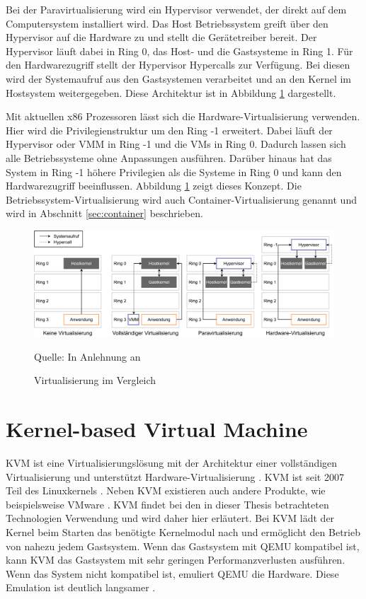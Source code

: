 Bei der Paravirtualisierung wird ein Hypervisor verwendet, der direkt auf dem Computersystem installiert wird. Das Host Betriebssystem greift über den Hypervisor auf die Hardware zu und stellt die Gerätetreiber bereit. Der Hypervisor läuft dabei in Ring 0, das Host- und die Gastsysteme in Ring 1. Für den Hardwarezugriff stellt der Hypervisor Hypercalls zur Verfügung. Bei diesen wird der Systemaufruf aus den Gastsystemen verarbeitet und an den Kernel im Hostsystem weitergegeben. Diese Architektur ist in Abbildung \ref{fig:virtualiserung} dargestellt.  \cite[vgl.][S. 237 f.]{Baun.2017}

Mit aktuellen x86 Prozessoren lässt sich die Hardware-Virtualisierung verwenden. Hier wird die Privilegienstruktur um den Ring -1 erweitert. Dabei läuft der Hypervisor oder \ac{VMM} in Ring -1 und die \acp{VM} in Ring 0. Dadurch lassen sich alle Betriebssysteme ohne Anpassungen ausführen. Darüber hinaus hat das System in Ring -1 höhere Privilegien als die Systeme in Ring 0 und kann den Hardwarezugriff beeinflussen. Abbildung \ref{fig:virtualiserung} zeigt dieses Konzept. Die Betriebssystem-Virtualisierung wird auch Container-Virtualisierung genannt und wird in Abschnitt \ref{sec:container} beschrieben. \cite[vgl.][S. 237 f.]{Baun.2017}

\begin{figure}[hb]
	\centering
	\includegraphics[width=1\linewidth]{gfx/virtualiserung.pdf}
	\caption{Virtualisierung im Vergleich}
	\footnotesize Quelle: In Anlehnung an \cite[vgl.][236, 238, 240]{Baun.2017}
	\label{fig:virtualiserung}
\end{figure} 

\section{Kernel-based Virtual Machine}
\label{sec:kvm}
\ac{KVM} ist eine Virtualisierungslösung mit der Architektur einer vollständigen Virtualisierung und unterstützt Hardware-Virtualisierung . \ac{KVM} ist seit 2007 Teil des Linuxkernels \cite[vgl.][8]{Peichert.20150928}. Neben \ac{KVM} existieren auch andere Produkte, wie beispielsweise VMware \cite[vgl.][237]{Baun.2017}. \ac{KVM} findet bei den in dieser Thesis betrachteten Technologien Verwendung und wird daher hier erläutert.
Bei \ac{KVM} lädt der Kernel beim Starten das benötigte Kernelmodul nach und ermöglicht den Betrieb von nahezu jedem Gastsystem. Wenn das Gastsystem mit \ac{QEMU} kompatibel ist, kann \ac{KVM} das Gastsystem mit sehr geringen Performanzverlusten ausführen. Wenn das System nicht kompatibel ist, emuliert \ac{QEMU} die Hardware. Diese Emulation ist deutlich langsamer \cite[vgl.][8]{Peichert.20150928}.

